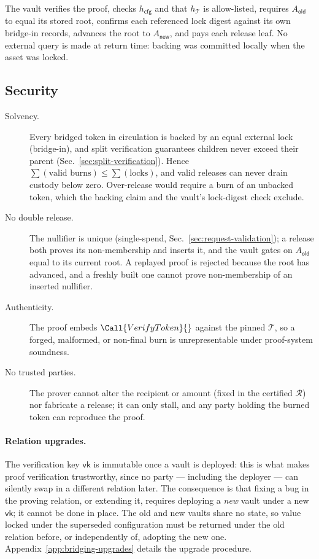 The vault verifies the proof, checks $h_\mathsf{cfg}$ and that $h_\mathcal{T}$ is allow-listed, requires $A_\mathsf{old}$ to equal its stored root, confirms each referenced lock digest against its own bridge-in records, advances the root to $A_\mathsf{new}$, and pays each release leaf. No external query is made at return time: backing was committed locally when the asset was locked.

\subsection{Security}\label{sec:bridge-security}

\begin{description}
\item[Solvency.] Every bridged token in circulation is backed by an equal external lock (bridge-in), and split verification guarantees children never exceed their parent (Sec.~\ref{sec:split-verification}). Hence $\sum(\text{valid burns}) \le \sum(\text{locks})$, and valid releases can never drain custody below zero. Over-release would require a burn of an unbacked token, which the backing claim and the vault's lock-digest check exclude.
\item[No double release.] The nullifier is unique (single-spend, Sec.~\ref{sec:request-validation}); a release both proves its non-membership and inserts it, and the vault gates on $A_\mathsf{old}$ equal to its current root. A replayed proof is rejected because the root has advanced, and a freshly built one cannot prove non-membership of an inserted nullifier.
\item[Authenticity.] The proof embeds $\Call{VerifyToken}{}$ against the pinned $\mathcal{T}$, so a forged, malformed, or non-final burn is unrepresentable under proof-system soundness.
\item[No trusted parties.] The prover cannot alter the recipient or amount (fixed in the certified $\mathcal{R}$) nor fabricate a release; it can only stall, and any party holding the burned token can reproduce the proof.
\end{description}

\paragraph{Relation upgrades.} The verification key $\mathsf{vk}$ is immutable once a vault is deployed: this is what makes proof verification trustworthy, since no party --- including the deployer --- can silently swap in a different relation later. The consequence is that fixing a bug in the proving relation, or extending it, requires deploying a \emph{new} vault under a new $\mathsf{vk}$; it cannot be done in place. The old and new vaults share no state, so value locked under the superseded configuration must be returned under the old relation before, or independently of, adopting the new one. Appendix~\ref{app:bridging-upgrades} details the upgrade procedure.

